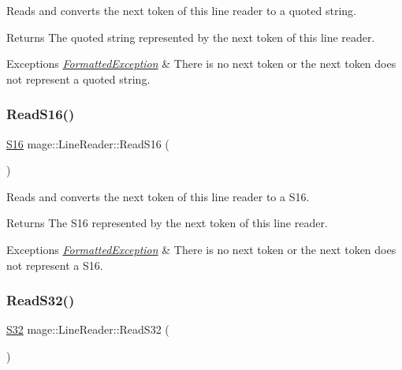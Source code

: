 Reads and converts the next token of this line reader to a quoted string.

\begin{DoxyReturn}{Returns}
The quoted string represented by the next token of this line reader. 
\end{DoxyReturn}

\begin{DoxyExceptions}{Exceptions}
{\em \hyperlink{structmage_1_1_formatted_exception}{Formatted\+Exception}} & There is no next token or the next token does not represent a quoted string. \\
\hline
\end{DoxyExceptions}
\hypertarget{classmage_1_1_line_reader_a9f3ca4ad3606d9b67a90698c2b71bdd0}{}\label{classmage_1_1_line_reader_a9f3ca4ad3606d9b67a90698c2b71bdd0} 
\subsubsection{\texorpdfstring{Read\+S16()}{ReadS16()}}
{\footnotesize\ttfamily \hyperlink{namespacemage_add9d3fe59b2a338108e98fcd67507005}{S16} mage\+::\+Line\+Reader\+::\+Read\+S16 (\begin{DoxyParamCaption}{ }\end{DoxyParamCaption})\hspace{0.3cm}{\ttfamily [protected]}}

Reads and converts the next token of this line reader to a {\ttfamily S16}.

\begin{DoxyReturn}{Returns}
The {\ttfamily S16} represented by the next token of this line reader. 
\end{DoxyReturn}

\begin{DoxyExceptions}{Exceptions}
{\em \hyperlink{structmage_1_1_formatted_exception}{Formatted\+Exception}} & There is no next token or the next token does not represent a {\ttfamily S16}. \\
\hline
\end{DoxyExceptions}
\hypertarget{classmage_1_1_line_reader_ad3218e41f29c2c3979d1be439835c72d}{}\label{classmage_1_1_line_reader_ad3218e41f29c2c3979d1be439835c72d} 
\subsubsection{\texorpdfstring{Read\+S32()}{ReadS32()}}
{\footnotesize\ttfamily \hyperlink{namespacemage_a642e05c5c83642b6946703615cdbf2da}{S32} mage\+::\+Line\+Reader\+::\+Read\+S32 (\begin{DoxyParamCaption}{ }\end{DoxyParamCaption})\hspace{0.3cm}{\ttfamily [protected]}}

